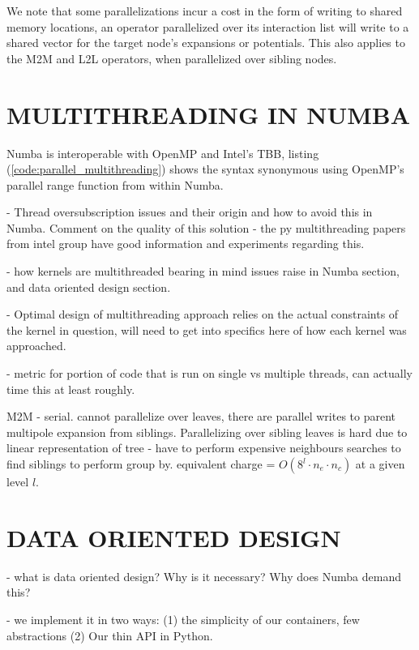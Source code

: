 \documentclass{IEEEcsmag}
\begin{document}
We note that some parallelizations incur a cost in the form of writing to shared memory locations, an operator parallelized over its interaction list will write to a shared vector for the target node's expansions or potentials. This also applies to the M2M and L2L operators, when parallelized over sibling nodes.

\section{MULTITHREADING IN NUMBA}

Numba is interoperable with OpenMP and Intel's TBB, listing (\ref{code:parallel_multithreading}) shows the syntax synonymous using OpenMP's parallel range function from within Numba. 

- Thread oversubscription issues and their origin and how to avoid this in Numba. Comment on the quality of this solution - the py multithreading papers from intel group have good information and experiments regarding this.

- how kernels are multithreaded bearing in mind issues raise in Numba section, and data oriented design section.

- Optimal design of multithreading approach relies on the actual constraints of the kernel in question, will need to get into specifics here of how each kernel was approached.

- metric for portion of code that is run on single vs multiple threads, can actually time this at least roughly.

M2M
- serial. cannot parallelize over leaves, there are parallel writes to parent multipole expansion from siblings. Parallelizing over sibling leaves is hard due to linear representation of tree - have to perform expensive neighbours searches to find siblings to perform group by. equivalent charge = $O(8^l \cdot n_e \cdot n_c)$ at a given level $l$.



\section{DATA ORIENTED DESIGN}

- what is data oriented design? Why is it necessary? Why does Numba demand this?

- we implement it in two ways: (1) the simplicity of our containers, few abstractions (2) Our thin API in Python.
\end{document}
